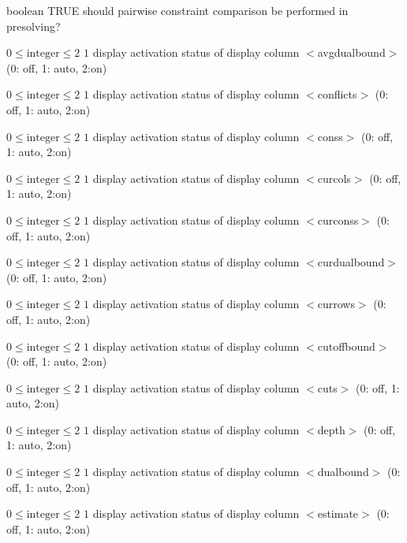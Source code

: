 %
{boolean}%
{TRUE}%
{should pairwise constraint comparison be performed in presolving?}%
{}

%
{$0\leq\textrm{integer}\leq2$}%
{$1$}%
{display activation status of display column $<$avgdualbound$>$ (0: off, 1: auto, 2:on)}%
{}

%
{$0\leq\textrm{integer}\leq2$}%
{$1$}%
{display activation status of display column $<$conflicts$>$ (0: off, 1: auto, 2:on)}%
{}

%
{$0\leq\textrm{integer}\leq2$}%
{$1$}%
{display activation status of display column $<$conss$>$ (0: off, 1: auto, 2:on)}%
{}

%
{$0\leq\textrm{integer}\leq2$}%
{$1$}%
{display activation status of display column $<$curcols$>$ (0: off, 1: auto, 2:on)}%
{}

%
{$0\leq\textrm{integer}\leq2$}%
{$1$}%
{display activation status of display column $<$curconss$>$ (0: off, 1: auto, 2:on)}%
{}

%
{$0\leq\textrm{integer}\leq2$}%
{$1$}%
{display activation status of display column $<$curdualbound$>$ (0: off, 1: auto, 2:on)}%
{}

%
{$0\leq\textrm{integer}\leq2$}%
{$1$}%
{display activation status of display column $<$currows$>$ (0: off, 1: auto, 2:on)}%
{}

%
{$0\leq\textrm{integer}\leq2$}%
{$1$}%
{display activation status of display column $<$cutoffbound$>$ (0: off, 1: auto, 2:on)}%
{}

%
{$0\leq\textrm{integer}\leq2$}%
{$1$}%
{display activation status of display column $<$cuts$>$ (0: off, 1: auto, 2:on)}%
{}

%
{$0\leq\textrm{integer}\leq2$}%
{$1$}%
{display activation status of display column $<$depth$>$ (0: off, 1: auto, 2:on)}%
{}

%
{$0\leq\textrm{integer}\leq2$}%
{$1$}%
{display activation status of display column $<$dualbound$>$ (0: off, 1: auto, 2:on)}%
{}

%
{$0\leq\textrm{integer}\leq2$}%
{$1$}%
{display activation status of display column $<$estimate$>$ (0: off, 1: auto, 2:on)}%
{}

